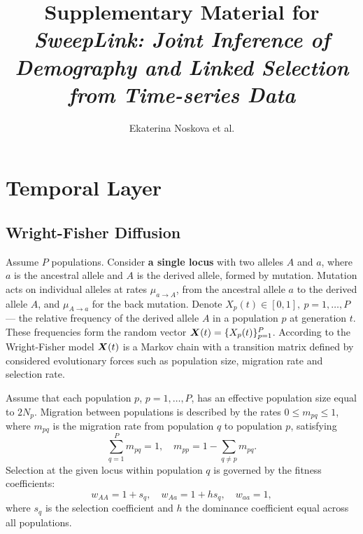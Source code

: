 \documentclass{article}
\title{Supplementary Material for \\
\textit{SweepLink: Joint Inference of Demography and Linked Selection from Time-series Data}}
\author{Ekaterina Noskova et al.}
\def\X{\mbox{\boldmath $X$}}
\begin{document}
\maketitle

\tableofcontents

\linenumbers

\section{Temporal Layer}
\subsection{Wright-Fisher Diffusion}

Assume $P$ populations.
Consider \textbf{a single locus} with two alleles $A$ and $a$, where $a$ is the ancestral allele and $A$ is the derived allele, formed by mutation.
Mutation acts on individual alleles at rates $\mu_{a \to A}$, from the ancestral allele $a$ to the derived allele $A$, and $\mu_{A \to a}$ for the back mutation.
Denote $X_p(t) \in [0,1],\ p=1,\ldots,P$ --- the relative frequency of the derived allele $A$ in a population $p$ at generation $t$.
These frequencies form the random vector $\X(t) = \{X_p(t)\}_{p=1}^P$. 
According to the Wright-Fisher model $\X(t)$ is a Markov chain with a transition matrix defined by considered evolutionary forces such as population size, migration rate and selection rate.

Assume that each population $p$, $p = 1, \ldots, P$, has an effective population size equal to $2N_p$.
Migration between populations is described by the rates $0 \leq m_{pq} \leq 1$, where $m_{pq}$ is the migration rate from population $q$ to population $p$, satisfying
\begin{equation*}
    \sum_{q=1}^P m_{pq} = 1, \quad m_{pp} = 1 - \sum_{q \neq p} m_{pq}.
\end{equation*}
Selection at the given locus within population $q$ is governed by the fitness coefficients:
\begin{equation*}
    w_{AA} = 1 + s_q, \quad w_{Aa} = 1 + h s_q, \quad w_{aa} = 1,
\end{equation*}
where $s_q$ is the selection coefficient and $h$ the dominance coefficient equal across all populations.
\end{document}
